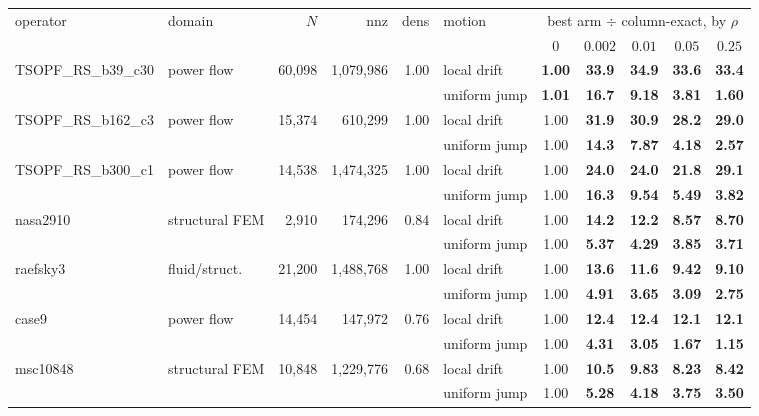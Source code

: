 \begin{tabular}{llrrrlccccc}
\toprule
operator & domain & $N$ & nnz & dens & motion & \multicolumn{5}{c}{best arm $\div$ column-exact, by $\rho$}\\
\cmidrule(lr){7-11}
 & & & & & & $0$ & $0.002$ & $0.01$ & $0.05$ & $0.25$ \\
\midrule
TSOPF\_RS\_b39\_c30 & power flow & 60,098 & 1,079,986 & 1.00 & local drift & \textbf{1.00} & \textbf{33.9} & \textbf{34.9} & \textbf{33.6} & \textbf{33.4} \\
 &  &  &  &  & uniform jump & \textbf{1.01} & \textbf{16.7} & \textbf{9.18} & \textbf{3.81} & \textbf{1.60} \\
TSOPF\_RS\_b162\_c3 & power flow & 15,374 & 610,299 & 1.00 & local drift & 1.00 & \textbf{31.9} & \textbf{30.9} & \textbf{28.2} & \textbf{29.0} \\
 &  &  &  &  & uniform jump & 1.00 & \textbf{14.3} & \textbf{7.87} & \textbf{4.18} & \textbf{2.57} \\
TSOPF\_RS\_b300\_c1 & power flow & 14,538 & 1,474,325 & 1.00 & local drift & 1.00 & \textbf{24.0} & \textbf{24.0} & \textbf{21.8} & \textbf{29.1} \\
 &  &  &  &  & uniform jump & 1.00 & \textbf{16.3} & \textbf{9.54} & \textbf{5.49} & \textbf{3.82} \\
nasa2910 & structural FEM & 2,910 & 174,296 & 0.84 & local drift & 1.00 & \textbf{14.2} & \textbf{12.2} & \textbf{8.57} & \textbf{8.70} \\
 &  &  &  &  & uniform jump & 1.00 & \textbf{5.37} & \textbf{4.29} & \textbf{3.85} & \textbf{3.71} \\
raefsky3 & fluid/struct. & 21,200 & 1,488,768 & 1.00 & local drift & 1.00 & \textbf{13.6} & \textbf{11.6} & \textbf{9.42} & \textbf{9.10} \\
 &  &  &  &  & uniform jump & 1.00 & \textbf{4.91} & \textbf{3.65} & \textbf{3.09} & \textbf{2.75} \\
case9 & power flow & 14,454 & 147,972 & 0.76 & local drift & 1.00 & \textbf{12.4} & \textbf{12.4} & \textbf{12.1} & \textbf{12.1} \\
 &  &  &  &  & uniform jump & 1.00 & \textbf{4.31} & \textbf{3.05} & \textbf{1.67} & \textbf{1.15} \\
msc10848 & structural FEM & 10,848 & 1,229,776 & 0.68 & local drift & 1.00 & \textbf{10.5} & \textbf{9.83} & \textbf{8.23} & \textbf{8.42} \\
 &  &  &  &  & uniform jump & 1.00 & \textbf{5.28} & \textbf{4.18} & \textbf{3.75} & \textbf{3.50} \\

\end{tabular}
